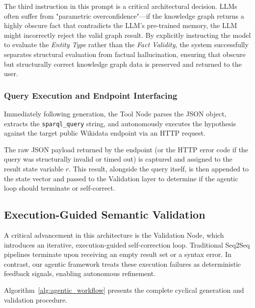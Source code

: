 The third instruction in this prompt is a critical architectural decision. LLMs often suffer from "parametric overconfidence"—if the knowledge graph returns a highly obscure fact that contradicts the LLM's pre-trained memory, the LLM might incorrectly reject the valid graph result. By explicitly instructing the model to evaluate the \textit{Entity Type} rather than the \textit{Fact Validity}, the system successfully separates structural evaluation from factual hallucination, ensuring that obscure but structurally correct knowledge graph data is preserved and returned to the user.

\subsubsection{Query Execution and Endpoint Interfacing}
Immediately following generation, the Tool Node parses the JSON object, extracts the \texttt{sparql\_query} string, and autonomously executes the hypothesis against the target public Wikidata endpoint via an HTTP request. 

The raw JSON payload returned by the endpoint (or the HTTP error code if the query was structurally invalid or timed out) is captured and assigned to the result state variable $r$. This result, alongside the query itself, is then appended to the state vector and passed to the Validation layer to determine if the agentic loop should terminate or self-correct.

\subsection{Execution-Guided Semantic Validation}
\label{sec:validation_node}

A critical advancement in this architecture is the Validation Node, which introduces an iterative, execution-guided self-correction loop. Traditional Seq2Seq pipelines terminate upon receiving an empty result set or a syntax error. In contrast, our agentic framework treats these execution failures as deterministic feedback signals, enabling autonomous refinement.

Algorithm~\ref{alg:agentic_workflow} presents the complete cyclical generation and validation procedure.

